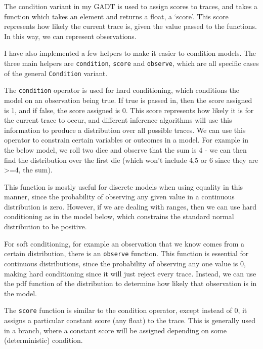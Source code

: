 The condition variant in my GADT is used to assign scores to traces, and takes a function which takes an element and returns a float, a `score'. This score represents how likely the current trace is, given the value passed to the functions. In this way, we can represent observations.
	
I have also implemented a few helpers to make it easier to condition models. The three main helpers are \texttt{condition}, \texttt{score} and \texttt{observe}, which are all specific cases of the general \texttt{Condition} variant. 
	
The \texttt{condition} operator is used for hard conditioning, which conditions the model on an observation being true. If true is passed in, then the score assigned is 1, and if false, the score assigned is 0. This score represents how likely it is for the current trace to occur, and different inference algorithms will use this information to produce a distribution over all possible traces. We can use this operator to constrain certain variables or outcomes in a model. For example in the below model, we roll two dice and observe that the sum is 4 - we can then find the distribution over the first die (which won't include 4,5 or 6 since they are >=4, the sum).
	
		
This function is mostly useful for discrete models when using equality in this manner, since the probability of observing any given value in a continuous distribution is zero. However, if we are dealing with ranges, then we can use hard conditioning as in the model below, which constrains the standard normal distribution to be positive.
	

For soft conditioning, for example an observation that we know comes from a certain distribution, there is an \texttt{observe} function. This function is essential for continuous distributions, since the probability of observing any one value is 0, making hard conditioning since it will just reject every trace. Instead, we can use the pdf function of the distribution to determine how likely that observation is in the model.
	
The \texttt{score} function is similar to the condition operator, except instead of 0, it assigns a particular constant score (any float) to the trace. This is generally used in a branch, where a constant score will be assigned depending on some (deterministic) condition.

